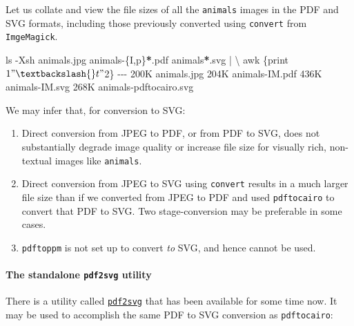 \documentclass[
  11pt,
  british,
  a4paper,
]{article}
\newenvironment{Shaded}{\begin{snugshade}}{\end{snugshade}}
\newcommand{\AttributeTok}[1]{\textcolor[rgb]{0.80,0.80,0.80}{#1}}
\newcommand{\DataTypeTok}[1]{\textcolor[rgb]{0.87,0.87,0.75}{#1}}
\newcommand{\ExtensionTok}[1]{\textcolor[rgb]{0.80,0.80,0.80}{#1}}
\newcommand{\FunctionTok}[1]{\textcolor[rgb]{0.94,0.94,0.56}{#1}}
\newcommand{\KeywordTok}[1]{\textcolor[rgb]{0.94,0.87,0.69}{#1}}
\newcommand{\NormalTok}[1]{\textcolor[rgb]{0.80,0.80,0.80}{#1}}
\newcommand{\OperatorTok}[1]{\textcolor[rgb]{0.94,0.94,0.82}{#1}}
\newcommand{\PreprocessorTok}[1]{\textcolor[rgb]{1.00,0.81,0.69}{\textbf{#1}}}
\newcommand{\StringTok}[1]{\textcolor[rgb]{0.80,0.58,0.58}{#1}}
\begin{document}
Let us collate and view the file sizes of all the \texttt{animals}
images in the PDF and SVG formats, including those previously converted
using \texttt{convert} from \texttt{ImgeMagick}.

\begin{Shaded}
\begin{Highlighting}[]
\FunctionTok{ls} \AttributeTok{{-}Xsh}\NormalTok{ animals.jpg animals{-}}\DataTypeTok{\{I}\OperatorTok{,}\DataTypeTok{p\}}\PreprocessorTok{*}\NormalTok{.pdf animals}\PreprocessorTok{*}\NormalTok{.svg }\KeywordTok{|} \DataTypeTok{\textbackslash{}}
\FunctionTok{awk} \StringTok{\textquotesingle{}\{print $1 "\textbackslash{}t" $2\}\textquotesingle{}}
\ExtensionTok{{-}{-}{-}}
\ExtensionTok{200K}\NormalTok{    animals.jpg}
\ExtensionTok{204K}\NormalTok{    animals{-}IM.pdf}
\ExtensionTok{436K}\NormalTok{    animals{-}IM.svg}
\ExtensionTok{268K}\NormalTok{    animals{-}pdftocairo.svg}
\end{Highlighting}
\end{Shaded}

We may infer that, for conversion to SVG:

\begin{enumerate}
\item
  Direct conversion from JPEG to PDF, or from PDF to SVG, does not
  substantially degrade image quality or increase file size for visually
  rich, non-textual images like \texttt{animals}.
\item
  Direct conversion from JPEG to SVG using \texttt{convert} results in a
  much larger file size than if we converted from JPEG to PDF and used
  \texttt{pdftocairo} to convert that PDF to SVG. Two stage-conversion
  may be preferable in some cases.
\item
  \texttt{pdftoppm} is not set up to convert \emph{to} SVG, and hence
  cannot be used.
\end{enumerate}

\hypertarget{the-standalone-pdf2svg-utility}{%
\paragraph{\texorpdfstring{The standalone \texttt{pdf2svg}
utility}{The standalone pdf2svg utility}}\label{the-standalone-pdf2svg-utility}}

There is a utility called
\href{https://github.com/dawbarton/pdf2svg}{\texttt{pdf2svg}} that has
been available for some time now. It may be used to accomplish the same
PDF to SVG conversion as \texttt{pdftocairo}:
\end{document}
